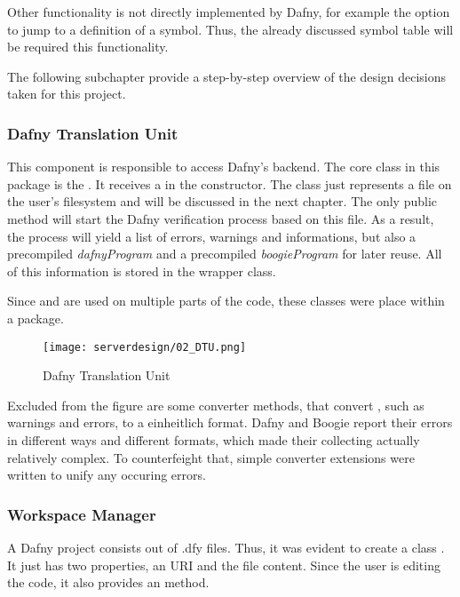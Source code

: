 Other functionality is not directly implemented by Dafny, for example the option to jump to a definition of a symbol. Thus, the already discussed symbol table will be required this functionality.

The following subchapter provide a step-by-step overview of the design decisions taken for this project.

\subsubsection{Dafny Translation Unit}
This component is responsible to access Dafny's backend. The core class in this package is the . It receives a  in the constructor. The class  just represents a file on the user's filesystem and will be discussed in the next chapter. The only public method  will start the Dafny verification process based on this file. As a result, the process will yield a list of errors, warnings and informations, but also a precompiled \textit{dafnyProgram} and a precompiled \textit{boogieProgram} for later reuse. All of this information is stored in the  wrapper class.

Since  and  are used on multiple parts of the code, these classes were place within a  package.

\begin{figure}[H]
    \centering
    \texttt{[image: serverdesign/02\_DTU.png]}
    \caption{Dafny Translation Unit}
    \label{fig:server_dtu}
\end{figure}

Excluded from the figure are some converter methods, that convert , such as warnings and errors, to a einheitlich format. Dafny and Boogie report their errors in different ways and different formats, which made their collecting actually relatively complex. To counterfeight that, simple converter extensions were written to unify any occuring errors.



\subsubsection{Workspace Manager}
A Dafny project consists out of .dfy files. Thus, it was evident to create a class . It just has two properties, an URI and the file content. Since the user is editing the code, it also provides an  method.

